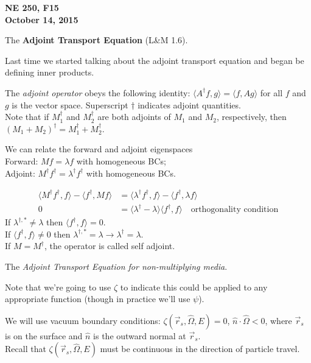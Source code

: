 \documentclass[12pt]{article}
\newcommand{\vOmega}{\ensuremath{\hat{\Omega}}}
\begin{document}
\begin{center}
{\bf NE 250, F15\\
October 14, 2015 
}
\end{center}

The \textbf{Adjoint Transport Equation} (L\&M 1.6).

Last time we started talking about the adjoint transport equation and began be defining inner products. 

The \textit{adjoint operator} obeys the following identity: $\langle A^{\dagger}f, g\rangle = \langle f, Ag\rangle$ for all $f$ and $g$ is the vector space. Superscript $\dagger$ indicates adjoint quantities.\\
Note that if $M_1^{\dagger}$ and $M_2^{\dagger}$ are both adjoints of $M_1$ and $M_2$, respectively, then $(M_1 + M_2)^{\dagger}  = M_1^{\dagger} + M_2^{\dagger}$.

We can relate the forward and adjoint eigenspaces\\
Forward: $Mf = \lambda f$ with homogeneous BCs;\\
Adjoint: $M^{\dagger}f^{\dagger} = \lambda^{\dagger} f^{\dagger}$ with homogeneous BCs.

\begin{align*}
\langle M^{\dagger}f^{\dagger}, f\rangle - \langle f^{\dagger}, Mf\rangle &= \langle\lambda^{\dagger} f^{\dagger}, f\rangle - \langle f^{\dagger} ,\lambda f\rangle \\
0 &= \langle\lambda^{\dagger} - \lambda\rangle \langle f^{\dagger}, f\rangle \quad \text{orthogonality condition}
\end{align*}
%
If $\lambda^{\dagger, *} \neq \lambda$ then $\langle f^{\dagger}, f\rangle = 0$.\\
If $\langle f^{\dagger}, f\rangle \neq 0$ then $\lambda^{\dagger, *} = \lambda \rightarrow \lambda^{\dagger} = \lambda$.\\
If $M = M^{\dagger}$, the operator is called self adjoint. 

The \textit{Adjoint Transport Equation for non-multiplying media}.

Note that we're going to use $\zeta$ to indicate this could be applied to any appropriate function (though in practice we'll use $\psi$).

We will use vacuum boundary conditions: $\zeta(\vec{r}_s, \vOmega, E) = 0$, $\hat{n} \cdot \vOmega < 0$, where $\vec{r}_s$ is on the surface and $\hat{n}$ is the outward normal at $\vec{r}_s$.\\
Recall that $\zeta(\vec{r}_s, \vOmega, E)$ must be continuous in the direction of particle travel.
\end{document}
